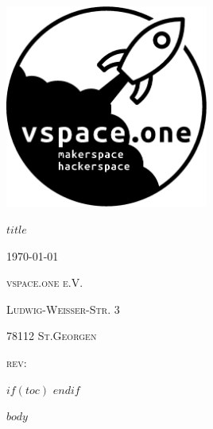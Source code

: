 \documentclass[12pt,a4paper]{article}
\begin{document}
\begin{titlepage}
	\centering
	\includegraphics[width=0.5\textwidth]{pics/logo.eps}\par\vspace{1cm}
  {\scshape\Huge $title$ \par}
	\vfill

	{\scshape\large \today\par}
	{\scshape\large vspace.one e.V. \par}
	{\scshape\large Ludwig-Weißer-Str. 3 \par}
	{\scshape\large 78112 St.Georgen \par}
	{\scshape\large rev: \GITAbrHash \par}
	\vspace{1cm}
\end{titlepage}

$if(toc)$
{
\tableofcontents
\clearpage
}
$endif$


$body$
\end{document}
